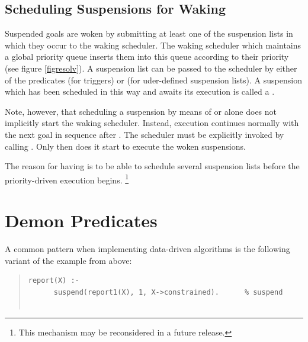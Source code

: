 {%
\subsection{Scheduling Suspensions for Waking}
\label{secwaking}%
Suspended goals are woken by submitting at least one of the suspension lists
in which they occur to the waking scheduler.
The waking scheduler which maintains a global priority queue inserts
them into this queue according to their priority (see figure \ref{figresolv}).
A suspension list can be passed to the scheduler by either of the predicates
(for triggers)
or
(for uder-defined suspension lists).
A suspension which has been scheduled in this way and awaits
its execution is called a
.

Note, however, that scheduling a suspension by means of
or
alone does not implicitly start the waking scheduler.
Instead, execution continues normally with the next goal in sequence after
.
The scheduler must be explicitly invoked by calling
.
Only then does it start to execute the woken suspensions.

The reason for having 
is to be able to schedule several suspension lists before the
priority-driven execution begins.%
\footnote{This mechanism may be reconsidered in a future release.}



\section{Demon Predicates}
\label{secdemon}%
A common pattern when implementing data-driven algorithms is the following
variant of the  example from above:
\begin{quote}
\begin{verbatim}
report(X) :-
      suspend(report1(X), 1, X->constrained).      % suspend


\end{verbatim}
\end{quote}}
